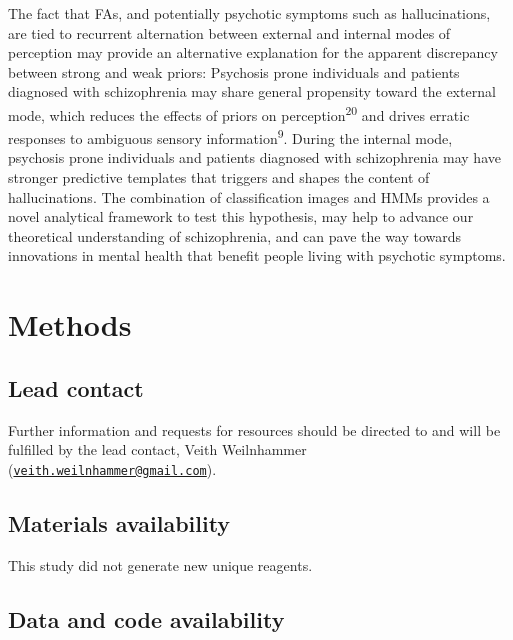 \documentclass[
]{article}
\begin{document}
The fact that FAs, and potentially psychotic symptoms such as
hallucinations, are tied to recurrent alternation between external and
internal modes of perception may provide an alternative explanation for
the apparent discrepancy between strong and weak priors: Psychosis prone
individuals and patients diagnosed with schizophrenia may share general
propensity toward the external mode, which reduces the effects of priors
on perception\textsuperscript{20} and drives erratic responses to
ambiguous sensory information\textsuperscript{9}. During the internal
mode, psychosis prone individuals and patients diagnosed with
schizophrenia may have stronger predictive templates that triggers and
shapes the content of hallucinations. The combination of classification
images and HMMs provides a novel analytical framework to test this
hypothesis, may help to advance our theoretical understanding of
schizophrenia, and can pave the way towards innovations in mental health
that benefit people living with psychotic symptoms.

\newpage

\hypertarget{methods}{%
\section{Methods}\label{methods}}

\hypertarget{lead-contact}{%
\subsection{Lead contact}\label{lead-contact}}

Further information and requests for resources should be directed to and
will be fulfilled by the lead contact, Veith Weilnhammer
(\href{mailto:veith.weilnhammer@gmail.com}{\nolinkurl{veith.weilnhammer@gmail.com}}).

\hypertarget{materials-availability}{%
\subsection{Materials availability}\label{materials-availability}}

This study did not generate new unique reagents.

\hypertarget{data-and-code-availability}{%
\subsection{Data and code
availability}\label{data-and-code-availability}}
\end{document}
